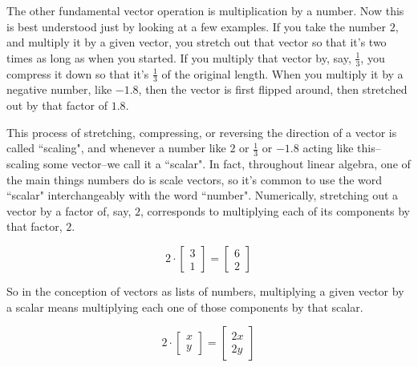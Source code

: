 The other fundamental vector operation is multiplication by a number. Now this
is best understood just by looking at a few examples. If you take the number
$2$, and multiply it by a given vector, you stretch out that vector so that it's
two times as long as when you started. If you multiply that vector by, say,
$\frac{1}{3}$, you compress it down so that it's $\frac{1}{3}$ of the original
length. When you multiply it by a negative number, like $-1.8$, then the vector
is first flipped around, then stretched out by that factor of $1.8$.

This process of stretching, compressing, or reversing the direction of a vector
is called ``scaling", and whenever a number like $2$ or $\frac{1}{3}$ or $-1.8$
acting like this--scaling some vector--we call it a ``scalar". In fact,
throughout linear algebra, one of the main things numbers do is scale vectors,
so it's common to use the word ``scalar" interchangeably with the word
``number". Numerically, stretching out a vector by a factor of, say, $2$,
corresponds to multiplying each of its components by that factor, $2$.

\begin{equation*}
  2 \cdot \begin{bmatrix}
    3 \\
    1
  \end{bmatrix} = \begin{bmatrix}
    6 \\
    2
  \end{bmatrix}
\end{equation*}

So in the conception of vectors as lists of numbers, multiplying a given vector
by a scalar means multiplying each one of those components by that scalar.

\begin{equation*}
  2 \cdot \begin{bmatrix}
    x \\
    y
  \end{bmatrix} = \begin{bmatrix}
    2x \\
    2y
  \end{bmatrix}
\end{equation*}
